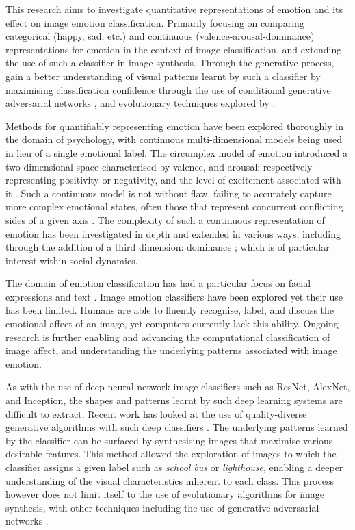 \documentclass{article}
\begin{document}
This research aims to investigate quantitative representations of emotion and its effect on image emotion classification.
Primarily focusing on comparing categorical (happy, sad, etc.) and continuous (valence-arousal-dominance) representations for emotion in the context of image classification, and extending the use of such a classifier in image synthesis.
Through the generative process, gain a better understanding of visual patterns learnt by such a classifier by maximising classification confidence through the use of conditional generative adversarial networks \citep{gauthier2014conditional}, and evolutionary techniques explored by \citep{nguyen2015deep}.

Methods for quantifiably representing emotion have been explored thoroughly in the domain of psychology, with continuous multi-dimensional models being used in lieu of a single emotional label.
The circumplex model of emotion introduced a two-dimensional space characterised by valence, and arousal; respectively representing positivity or negativity, and the level of excitement associated with it \citep{russell1980circumplex}.
Such a continuous model is not without flaw, failing to accurately capture more complex emotional states, often those that represent concurrent conflicting sides of a given axis \citep{larsen1992promises}.
The complexity of such a continuous representation of emotion has been investigated in depth and extended in various ways, including through the addition of a third dimension: dominance \citep{bradley1994measuring}; which is of particular interest within social dynamics.

The domain of emotion classification has had a particular focus on facial expressions and text \citep{cambria2016affective, warriner2013norms}.
Image emotion classifiers have been explored \citep{kim2018building, machajdik2010affective, chen2015learning, chen2014deepsentibank} yet their use has been limited.
Humans are able to fluently recognise, label, and discuss the emotional affect of an image, yet computers currently lack this ability.
Ongoing research is further enabling and advancing the computational classification of image affect, and understanding the underlying patterns associated with image emotion.

As with the use of deep neural network image classifiers such as ResNet, AlexNet, and Inception, the shapes and patterns learnt by such deep learning systems are difficult to extract.
Recent work has looked at the use of quality-diverse generative algorithms with such deep classifiers \citep{nguyen2015deep, nguyen2015innovation}.
The underlying patterns learned by the classifier can be surfaced by synthesising images that maximise various desirable features.
This method allowed the exploration of images to which the classifier assigns a given label such as \textit{school bus} or \textit{lighthouse}, enabling a deeper understanding of the visual characteristics inherent to each class.
This process however does not limit itself to the use of evolutionary algorithms for image synthesis, with other techniques including the use of generative adversarial networks \citep{GAN}.
\end{document}
